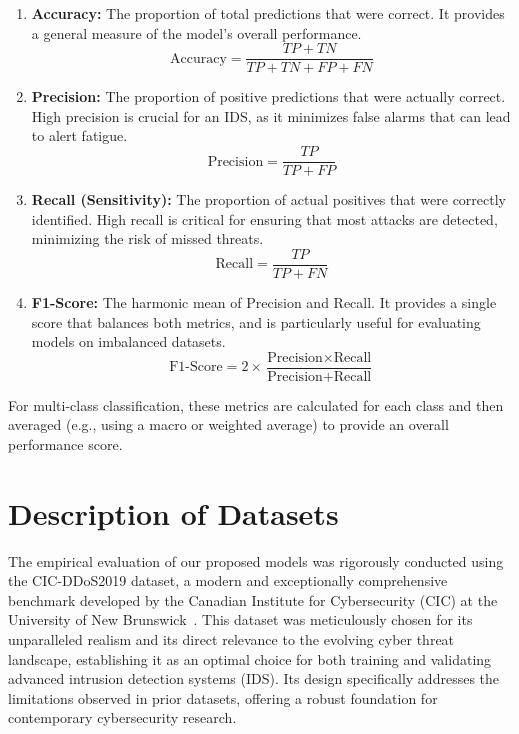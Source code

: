 \documentclass[12pt]{report}
\begin{document}
\begin{enumerate}
    \item \textbf{Accuracy:} The proportion of total predictions that were correct. It provides a general measure of the model's overall performance.
    \begin{equation}
        \text{Accuracy} = \frac{TP + TN}{TP + TN + FP + FN}
    \end{equation}

    \item \textbf{Precision:} The proportion of positive predictions that were actually correct. High precision is crucial for an IDS, as it minimizes false alarms that can lead to alert fatigue.
    \begin{equation}
        \text{Precision} = \frac{TP}{TP + FP}
    \end{equation}

    \item \textbf{Recall (Sensitivity):} The proportion of actual positives that were correctly identified. High recall is critical for ensuring that most attacks are detected, minimizing the risk of missed threats.
    \begin{equation}
        \text{Recall} = \frac{TP}{TP + FN}
    \end{equation}

    \item \textbf{F1-Score:} The harmonic mean of Precision and Recall. It provides a single score that balances both metrics, and is particularly useful for evaluating models on imbalanced datasets.
    \begin{equation}
        \text{F1-Score} = 2 \times \frac{\text{Precision} \times \text{Recall}}{\text{Precision} + \text{Recall}}
    \end{equation}
\end{enumerate}

For multi-class classification, these metrics are calculated for each class and then averaged (e.g., using a macro or weighted average) to provide an overall performance score.

\section{Description of Datasets}

The empirical evaluation of our proposed models was rigorously conducted using the CIC-DDoS2019 dataset, a modern and exceptionally comprehensive benchmark developed by the Canadian Institute for Cybersecurity (CIC) at the University of New Brunswick~\cite{lashkari2017characterization}. This dataset was meticulously chosen for its unparalleled realism and its direct relevance to the evolving cyber threat landscape, establishing it as an optimal choice for both training and validating advanced intrusion detection systems (IDS). Its design specifically addresses the limitations observed in prior datasets, offering a robust foundation for contemporary cybersecurity research.
\end{document}
